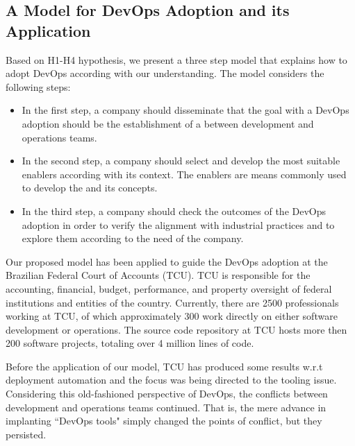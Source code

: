 \subsection{A Model for DevOps Adoption and its Application}\label{sec:case_study}

Based on H1-H4 hypothesis, we present a three step model that
explains how to adopt DevOps according with our understanding. The
model considers the following steps:
\begin{itemize}
\item In the first step, a company should
disseminate that the goal with a DevOps adoption should be
the establishment of a \cc between
development and operations teams.

\item In the second step, a company should select and develop
the most suitable enablers according with its context. The enablers
are means commonly used to develop the 
and its concepts.

\item In the third step, a company should check the outcomes of the
DevOps adoption in order to verify the alignment with
industrial practices and to explore them according to the
need of the company.
\end{itemize}



Our proposed model has been applied to guide the DevOps adoption at the Brazilian Federal Court of
Accounts (TCU). TCU is responsible for the accounting, financial, budget, performance, and property
oversight of federal institutions and entities of the country. Currently, there are 2500
professionals working at TCU, of which approximately 300 work directly on either
software development or operations. The source code repository at TCU hosts more then 200 software projects, totaling
over 4 million lines of code.

Before the application of our model, TCU has produced some results w.r.t deployment
automation and the focus was being directed to the tooling issue. Considering this
old-fashioned perspective of DevOps, the conflicts between development and operations
teams continued. That is, the mere advance in implanting ``DevOps tools" simply
changed the points of conflict, but they persisted.


